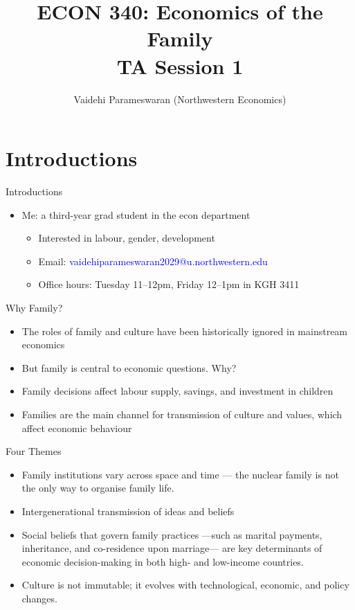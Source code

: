 \documentclass[11pt,notes=hide,aspectratio=169,mathserif]{beamer}
\title[class]{ECON 340: Economics of the Family \\ TA Session 1}
\author[vaidehi's class ]{Vaidehi Parameswaran (Northwestern Economics)}
\date{\monthname[\the\month] \the\year}
\begin{document}
\begin{frame}[plain]
\titlepage
\end{frame}

\section{Introductions}
\begin{frame}{Introductions}
\begin{itemize}
  \item Me: a third-year grad student in the econ department
  \begin{itemize}
    \item Interested in labour, gender, development
    \item Email: \textcolor{blue}{vaidehiparameswaran2029@u.northwestern.edu}
    \item Office hours: Tuesday 11--12pm, Friday 12--1pm in KGH 3411
  \end{itemize}
\end{itemize}
\end{frame}

\begin{frame}{Why Family?}
\begin{itemize}
  \item The roles of family and culture have been historically ignored in mainstream economics
  \item But family is central to economic questions. Why?
  \pause \item Family decisions affect labour supply, savings, and investment in children
  \pause \item Families are the main channel for transmission of culture and values, which affect economic behaviour
\end{itemize}
\end{frame}

\begin{frame}{Four Themes}
\begin{itemize}
  \item Family institutions vary across space and time — the nuclear family is not the only way to organise family life.
  \item Intergenerational transmission of ideas and beliefs
  \item Social beliefs that govern family practices —such as marital payments, inheritance, and co-residence upon marriage— are key determinants of economic decision-making in both high- and low-income countries.
  \item Culture is not immutable; it evolves with technological, economic, and policy changes.
\end{itemize}
\end{frame}
\end{document}
